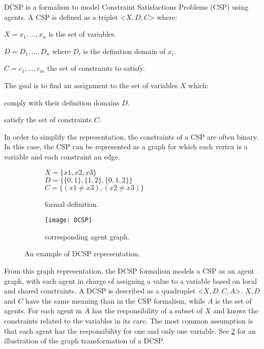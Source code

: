 DCSP is a formalism to model Constraint Satisfactions Problems (CSP) using agents. A CSP is defined as a triplet <$X,D,C$> where:
\begin{compactitem}
\item $X = {x_1, ..., x_n}$ is the set of variables.
\item $D = {D_1, ..., D_n}$ where $D_i$ is the definition domain of $x_i$.
\item $C ={c_1, ..., c_m}$ the set of constraints to satisfy.
\end{compactitem}

The goal is to find an assignment to the set of variables $X$ which:
\begin{compactitem}
\item comply with their definition domains $D$.
\item satisfy the set of constraints $C$.
\end{compactitem}

In order to simplify the representation, the constraints of a CSP are often binary. In this case, the CSP can be represented as a graph for which each vertex is a variable and each constraint an edge.

\begin{figure}[]
\centering
	\begin{subfigure}[b]{0.35\textwidth}
			$X = \{x1, x2, x3\}$\\
			$D = \{\{0,1\}, \{1,2\}, \{0,1,2\}\}$\\
			$C = \{(x1 \neq x3), (x2 \neq x3)\}$		
		\caption{formal definition.}
	\end{subfigure}
	\begin{subfigure}[b]{0.45\textwidth}
			\centering
			\texttt{[image: DCSP]}
			\caption{corresponding agent graph.}\label{dcsp:graph}
	\end{subfigure}

\caption{An example of DCSP representation.}
\label{dcsp}

\end{figure}

From this graph representation, the DCSP formalism\cite{yokoo1998distributed} models a CSP  as an agent graph, with each agent in charge of assigning a value to a variable based on local and shared constraints. A DCSP is described as a quadruplet <$X, D, C, A$>. $X, D$ and $C$ have the same meaning than in the CSP formalism, while $A$ is the set of agents. For each agent in $A$ has the responsibility of a subset of $X$ and knows the constraints related to the variables in its care. The most common assumption is that each agent has the responsibility for one and only one variable. See \figurename{} \ref{dcsp} for an illustration of the graph transformation of a DCSP.

